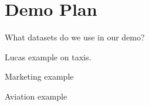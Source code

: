 \documentclass[conference]{IEEEtran}
\begin{document}
\vspace{-5pt}
\section{Demo Plan}

 What datasets do we use in our demo?

 Lucas example on taxis.

 Marketing example

 Aviation example







\end{document}
